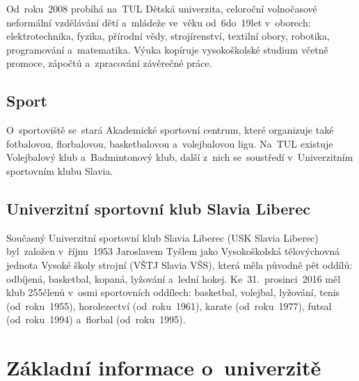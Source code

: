 \documentclass[a4paper,12pt,fonts,nocapnumbers,listingsleft]{./tulpackage/tularticle}
\begin{document}
Od~roku~2008 probíhá na~TUL Dětská univerzita, celoroční volnočasové neformální vzdělávání dětí a~mládeže
ve~věku od~6\thinspace{}do~19\thinspace{}let v~oborech: elektrotechnika, fyzika, přírodní vědy, strojírenství,
textilní obory, robotika, programování a~matematika. Výuka kopíruje vysokoškolské studium včetně promoce,
zápočtů a~zpracování závěrečné práce.
~\cite{jandova} %

\subsection{Sport}

O~sportoviště se~stará Akademické sportovní centrum, které organizuje také fotbalovou, florbalovou,
basketbalovou a~volejbalovou ligu. Na~TUL existuje Volejbalový klub a~Badmintonový klub,
další z~nich se~soustředí v~Univerzitním sportovním klubu Slavia.
~\cite{golka}

\clearpage

\subsection{Univerzitní sportovní klub Slavia Liberec}

Současný Univerzitní sportovní klub Slavia Liberec (USK Slavia Liberec) byl~založen
v~říjnu~1953 Jaroslavem Tyšlem jako Vysokoškolská tělovýchovná jednota
Vysoké školy strojní (VŠTJ Slavia VŠS), která měla původně pět oddílů: odbíjená, basketbal,
kopaná, lyžování a~lední hokej. Ke~31.~prosinci~2016 měl klub 255\thinspace{}členů
v~osmi sportovních oddílech: basketbal, volejbal, lyžování, tenis (od~roku~1955),
horolezectví (od~roku~1961), karate (od~roku~1977), futsal (od~roku~1994) a~florbal
(od~roku~1995).~\cite{golka} %

\clearpage

\section{Základní informace o~univerzitě}
\end{document}
